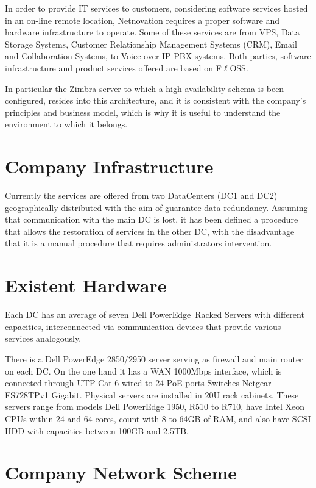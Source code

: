\documentclass[a4paper, 12pt]{book}
\begin{document}
In order to provide IT services to customers, considering software services hosted in an on-line remote location, Netnovation requires a proper software and hardware infrastructure to operate. Some of these services are from VPS, Data Storage Systems, Customer Relationship Management Systems (CRM), Email and Collaboration Systems, to Voice over IP PBX systems. Both parties, software infrastructure and product services offered are based on F$\ell$OSS.\bigskip

\noindent In particular the Zimbra server to which a high availability schema is been configured, resides into this architecture, and it is consistent with the company's principles and business model, which is why it is useful to understand the environment to which it belongs.


\section{Company Infrastructure}
\label{sec:infrastructure}

Currently the services are offered from two DataCenters (DC1 and DC2) geographically distributed with the aim of guarantee data redundancy. Assuming that communication with the main DC is lost, it has been defined a procedure that allows the restoration of services in the other DC, with the disadvantage that it is a manual procedure that requires administrators intervention.

\section{Existent Hardware}
\label{sec:hardware}

Each DC has an average of seven Dell PowerEdge\texttrademark \ Racked Servers with different capacities, interconnected via communication devices that provide various services analogously.\bigskip

\noindent There is a Dell PowerEdge 2850/2950 server serving as firewall and main router on each DC. On the one hand it has a WAN 1000Mbps interface, which is connected through UTP Cat-6 wired to 24 PoE ports Switches Netgear FS728TPv1 Gigabit. Physical servers are installed in 20U rack cabinets. These servers range from models Dell PowerEdge 1950, R510 to R710, have Intel Xeon CPUs within 24 and 64 cores, count with 8 to 64GB of RAM, and also have SCSI HDD with capacities between 100GB and 2,5TB.


\section{Company Network Scheme}
\label{sec:networkscheme}
\end{document}
